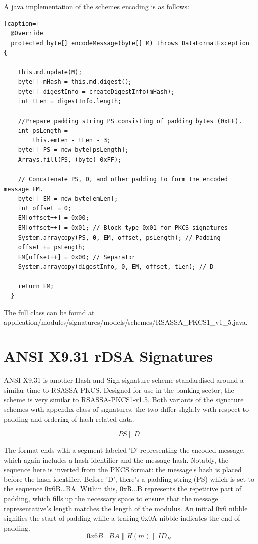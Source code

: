 \documentclass[]{final_report}
\theoremstyle{definition}
\begin{document}
A java implementation of the schemes encoding is as follows: 
\begin{lstlisting}[caption=]
  @Override
  protected byte[] encodeMessage(byte[] M) throws DataFormatException {

    this.md.update(M);
    byte[] mHash = this.md.digest();
    byte[] digestInfo = createDigestInfo(mHash);
    int tLen = digestInfo.length;
    
    //Prepare padding string PS consisting of padding bytes (0xFF).
    int psLength =
        this.emLen - tLen - 3;
    byte[] PS = new byte[psLength];
    Arrays.fill(PS, (byte) 0xFF);

    // Concatenate PS, D, and other padding to form the encoded message EM.
    byte[] EM = new byte[emLen];
    int offset = 0;
    EM[offset++] = 0x00; 
    EM[offset++] = 0x01; // Block type 0x01 for PKCS signatures
    System.arraycopy(PS, 0, EM, offset, psLength); // Padding
    offset += psLength;
    EM[offset++] = 0x00; // Separator
    System.arraycopy(digestInfo, 0, EM, offset, tLen); // D

    return EM;
  }
\end{lstlisting}
The full class can be found at application/modules/signatures/models/schemes/RSASSA\_PKCS1\_v1\_5.java.

\section{ANSI X9.31 rDSA Signatures}
ANSI X9.31 \cite{ANSI-1998-X9-31} is another Hash-and-Sign signature scheme standardised around a similar time to RSASSA-PKCS. Designed for use in the banking sector, the scheme is very similar to RSASSA-PKCS1-v1.5. Both variants of the signature schemes with appendix class of signatures, the two differ slightly with respect to padding and ordering of hash related data.


\[PS\|D\]

The format ends with a segment labeled 'D' representing the encoded message, which again includes a hash identifier and the message hash. Notably, the sequence here is inverted from the PKCS format: the message's hash is placed before the hash identifier. Before 'D', there's a padding string (PS) which is set to the sequence 0x6B...BA. Within this, 0xB...B represents the repetitive part of padding, which fills up the necessary space to ensure that the message representative's length matches the length of the modulus. An initial 0x6 nibble signifies the start of padding while a trailing 0x0A nibble indicates the end of padding.
\[0x6B . . . BA\|H(m)\|ID_{H}\]
\end{document}

